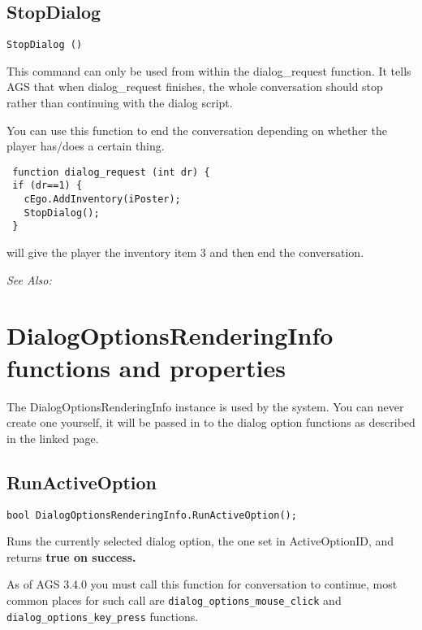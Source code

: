 \subsection{StopDialog}\label{StopDialog}%

\begin{verbatim}
StopDialog ()
\end{verbatim}
This command can only be used from within the dialog_request function. It
tells AGS that when dialog_request finishes, the whole conversation should
stop rather than continuing with the dialog script.

You can use this function to end the conversation depending on whether the
player has/does a certain thing.

\begin{verbatim}
 function dialog_request (int dr) {
 if (dr==1) {
   cEgo.AddInventory(iPoster);
   StopDialog();
 }
\end{verbatim}
will give the player the inventory item 3 and then end the conversation.

\it{See Also:} 



\section{DialogOptionsRenderingInfo functions and properties}\label{DialogOptionsRenderingInfoFunctions}%

The DialogOptionsRenderingInfo instance is used by the 
system. You can never create one yourself, it will be passed in to the dialog option functions as
described in the linked page.

\subsection{RunActiveOption}\label{DialogOptionsRenderingInfo.RunActiveOption}%

\begin{verbatim}
bool DialogOptionsRenderingInfo.RunActiveOption();
\end{verbatim}
Runs the currently selected dialog option, the one set in ActiveOptionID, and returns \bf{true} on success.

As of AGS 3.4.0 you must call this function for conversation to continue, most common places
for such call are \verb$dialog_options_mouse_click$ and \verb$dialog_options_key_press$ functions.

